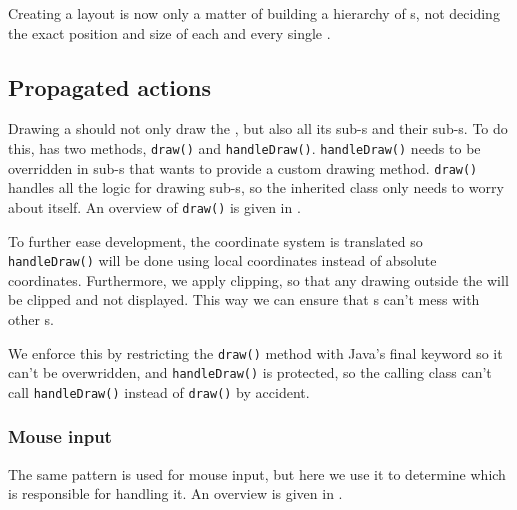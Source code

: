 
Creating a layout is now only a matter of building a hierarchy of
s, not deciding the exact position and size of each and every
single .

\subsection{Propagated actions}
\label{sec:actions}

Drawing a  should not only draw the , but also
all its sub-s and their sub-s. To do this,
 has two methods, \texttt{draw()} and \texttt{handleDraw()}.
\texttt{handleDraw()} needs to be overridden in sub-s that 
wants to provide a custom drawing method. \texttt{draw()} handles all the logic
for drawing sub-s, so the inherited class only needs to worry
about itself. An overview of \texttt{draw()} is given in
.

 


To further ease development, the coordinate system is translated so
\texttt{handleDraw()} will be done using local coordinates instead of absolute
coordinates.  Furthermore, we apply clipping, so that any drawing outside the
 will be clipped and not displayed. This way we can ensure that
s can't mess with other s.

We enforce this by restricting the \texttt{draw()} method with Java's final
keyword so it can't be overwridden, and \texttt{handleDraw()} is protected, so
the calling class can't call \texttt{handleDraw()} instead of \texttt{draw()} by
accident.

\subsubsection{Mouse input}

The same pattern is used for mouse input, but here we use it to determine which
 is responsible for handling it. An overview is given in
.

